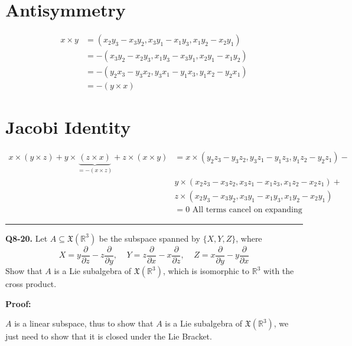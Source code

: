 \documentclass{article}
\newcommand{\R}{\mathbb{R}}
\begin{document}
\vskip 1cm
\section*{Antisymmetry}
\begin{align*}
  x \times y &= \left(x_2y_3 - x_3y_2, x_3y_1 - x_1y_3, x_1y_2 - x_2y_1 \right) \\
  &= -\left(x_3y_2 - x_2y_3, x_1y_3 - x_3y_1, x_2y_1 - x_1y_2 \right) \\
  &= -\left(y_2x_3 - y_3x_2, y_3x_1 - y_1x_3, y_1x_2 - y_2x_1 \right) \\
  &= -\left(y \times x\right)
\end{align*}


\vskip 1cm

\section*{Jacobi Identity}
\begin{align*}
  x \times \left(y \times z\right) + y \times \underbrace{\left(z \times x\right)}_{=-(x \times z)} + z \times \left(x \times y \right) &= x \times \left(y_2z_3 - y_3z_2, y_3z_1 - y_1z_3, y_1z_2 - y_2z_1 \right) - \\
  &y \times \left(x_2z_3 - x_3z_2, x_3z_1 - x_1z_3, x_1z_2 - x_2z_1 \right) + \\
  &z \times \left(x_2y_3 - x_3y_2, x_3y_1 - x_1y_3, x_1y_2 - x_2y_1 \right) \\
  &= 0 \text{ All terms cancel on expanding}
\end{align*}

\vskip 0.5cm
\hrule 
\vskip 0.5cm




\textbf{Q8-20.} Let $A \subseteq \mathfrak{X}\left(\R^3\right)$  be the subspace spanned by $\{X, Y, Z\}$, where 
\[ X = y \frac{\partial}{\partial z} - z \frac{\partial}{\partial y}, \;\;\;\; Y = z \frac{\partial }{\partial x} - x \frac{\partial }{\partial z}, \;\;\;\; Z = x \frac{\partial }{\partial y} - y \frac{\partial }{\partial x}   \]
Show that $A$ is a Lie subalgebra of $\mathfrak{X}\left(\R^3\right)$, which is isomorphic to $\R^3$ with the cross product.

\vskip 0.5cm
\textbf{Proof:}

$A$ is a linear subspace, thus to show that $A$ is a Lie subalgebra of $\mathfrak{X}\left(\R^3\right)$, we just need to show that it is closed under the Lie Bracket.
\end{document}
